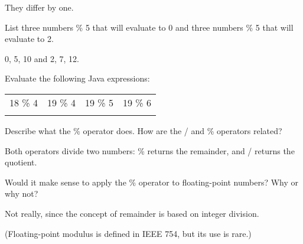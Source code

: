 \begin{answer}
They differ by one.
\end{answer}


\Q List three numbers \% 5 that will evaluate to 0 and three numbers \% 5 that will evaluate to 2.

\begin{answer}
0, 5, 10 and 2, 7, 12.
\end{answer}


\Q Evaluate the following Java expressions:

\begin{center}
\begin{tabular}{C{1in}C{1in}C{1in}C{1in}}
18 \% 4  &  19 \% 4   &  19 \% 5  &  19 \% 6  \\
\vspace{1ex}
  &     &    &    \\
\end{tabular}
\end{center}


\Q Describe what the \% operator does.
How are the / and \% operators related?

\begin{answer}
Both operators divide two numbers: \% returns the remainder, and / returns the quotient.
\end{answer}


\Q Would it make sense to apply the \% operator to floating-point numbers?
Why or why not?

\begin{answer}
Not really, since the concept of remainder is based on integer division.

(Floating-point modulus is defined in IEEE 754, but its use is rare.)
\end{answer}


